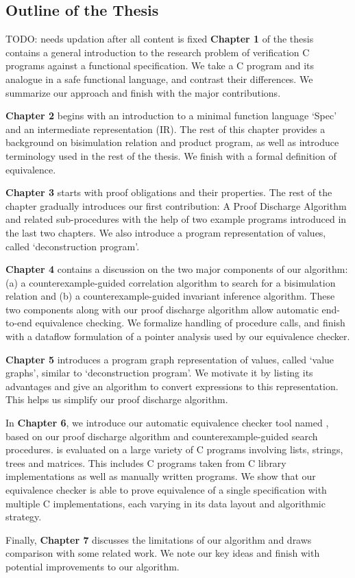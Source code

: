 

\subsection{Outline of the Thesis}
\label{sec:outline}
TODO: needs updation after all content is fixed
\textbf{Chapter 1} of the thesis contains a general introduction to the research problem of verification C programs against a functional specification.
We take a C program and its analogue in a safe functional language, and contrast their differences.
We summarize our approach and finish with the major contributions.

\textbf{Chapter 2} begins with an introduction to a minimal function language `Spec' and an intermediate representation (IR).
The rest of this chapter provides a background on bisimulation relation and product program, as well as
introduce terminology used in the rest of the thesis.
We finish with a formal definition of equivalence.

\textbf{Chapter 3} starts with proof obligations and their properties.
The rest of the chapter gradually introduces our first contribution: A Proof Discharge Algorithm and related sub-procedures with the help
of two example programs introduced in the last two chapters. We also introduce a program representation of values, called `deconstruction program'.

\textbf{Chapter 4} contains a discussion on the two major components of our algorithm: (a) a counterexample-guided correlation algorithm
to search for a bisimulation relation and (b) a counterexample-guided invariant inference algorithm.
These two components along with our proof discharge algorithm allow automatic end-to-end equivalence checking.
We formalize handling of procedure calls, and finish with a dataflow formulation of a pointer analysis
used by our equivalence checker.

\textbf{Chapter 5} introduces a program graph representation of values, called `value graphs', similar to `deconstruction program'.
We motivate it by listing its advantages and give an algorithm to convert expressions to this representation.
This helps us simplify our proof discharge algorithm.

In \textbf{Chapter 6}, we introduce our automatic equivalence checker tool named \toolName{}, based on our proof discharge algorithm
and counterexample-guided search procedures.
\toolName{} is evaluated on a large variety of C programs involving lists, strings, trees and matrices.
This includes C programs taken from C library implementations as well as manually written programs. We show that our equivalence checker is able
to prove equivalence of a single specification with multiple C implementations, each varying in its data layout and algorithmic strategy.

Finally, \textbf{Chapter 7} discusses the limitations of our algorithm and draws comparison with some related work.
We note our key ideas and finish with potential improvements to our algorithm.